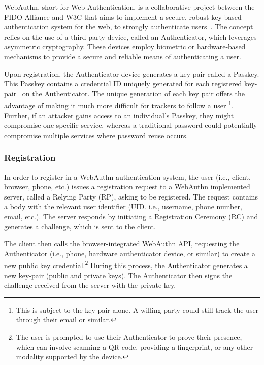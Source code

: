
\newcommand{\credIdentifier}{\footnote{There is a requirement to check whether the credential identifier, generated by the Authenticator
device exsits on the server.
For further discussions on this topic, see section \hyperref[sec:futurework]{Future work}}}

\newcommand{\navigatorApi}{\footnote{In LessPM's case, this is the \textit{navigator.credentials} API provided by the browser.}}


WebAuthn, short for Web Authentication, is a collaborative project between the FIDO Alliance and W3C that aims to
implement a secure, robust key-based authentication system for the web, to strongly authenticate users~\cite{webauthn_level_2}.
The concept relies on the use of a third-party device, called an Authenticator, which leverages asymmetric cryptography.
These devices employ biometric or hardware-based mechanisms to provide a secure and reliable means of authenticating a
user.

Upon registration, the Authenticator device generates a key pair called a Passkey.
This Passkey contains a credential ID uniquely generated for each registered key-pair~\cite{webauthn_credential_id,webauthn_public_key_credential}
on the Authenticator.
The unique generation of each key pair offers the advantage of making it much more difficult for trackers to follow a user
\footnote{This is subject to the key-pair alone. A willing party could still track the user through their email or similar.}.
Further, if an attacker gains access to an individual's Passkey, they might compromise one specific service, whereas
a traditional password could potentially compromise multiple services where password reuse occurs\cite{wang2018next}.

\subsubsection{Registration}\label{subsubsec:registration}
In order to register in a WebAuthn authentication system, the user (i.e., client, browser, phone, etc.) issues a registration request to a
WebAuthn implemented server, called a Relying Party (RP), asking to be registered.
The request contains a body with the relevant user identifier (UID. i.e., username, phone number, email, etc.).
The server responds by initiating a Registration Ceremony (RC) and generates a challenge, which is sent to the client.

The client then calls the browser-integrated WebAuthn API, requesting the Authenticator (i.e., phone, hardware authenticator device, or similar)
to create a new public key credential.\footnote{
  The user is prompted to use their Authenticator to prove their presence, which can involve scanning a QR code,
  providing a fingerprint, or any other modality supported by the device.}
During this process, the Authenticator generates a new key-pair (public and private keys). The Authenticator then signs the challenge received from the server with the private key.


